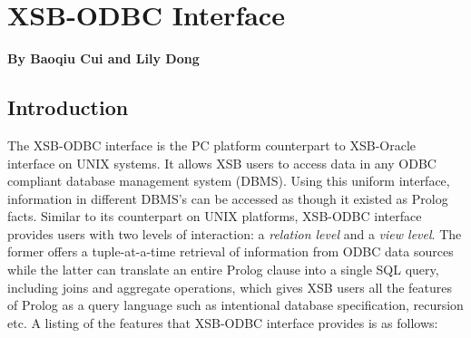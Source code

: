 \chapter{XSB-ODBC Interface} \label{odbc_interface}

\begin{center}
{\Large {\bf By Baoqiu Cui and Lily Dong }}
\end{center}

\section{Introduction}

The XSB-ODBC interface is the PC platform counterpart to XSB-Oracle
interface on UNIX systems. It allows XSB users to access data in any
ODBC compliant database management system (DBMS). Using this uniform
interface, information in different DBMS's can be accessed as though it
existed as Prolog facts. Similar to its counterpart on UNIX platforms,
XSB-ODBC interface provides users with two levels of interaction: a {\it
relation level} and a {\it view level}.  The former offers a
tuple-at-a-time retrieval of information from ODBC data sources while
the latter can translate an entire Prolog clause into a single SQL
query, including joins and aggregate operations, which gives XSB users
all the features of Prolog as a query language such as intentional
database specification, recursion etc.  A listing of the features that
XSB-ODBC interface provides is as follows:

